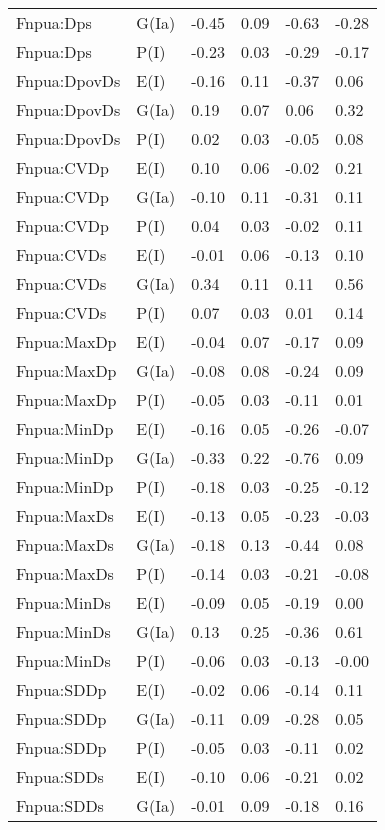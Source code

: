 \begin{center}
\begin{longtable}{|p{1.1in}|p{0.7in}|p{0.7in}|p{0.6in}|p{0.6in}|p{0.6in}|}
  Fnpua:Dps & G(Ia) & -0.45 & 0.09 & -0.63 & -0.28 \\ 
  Fnpua:Dps & P(I) & -0.23 & 0.03 & -0.29 & -0.17 \\ 
  Fnpua:DpovDs & E(I) & -0.16 & 0.11 & -0.37 & 0.06 \\ 
  Fnpua:DpovDs & G(Ia) & 0.19 & 0.07 & 0.06 & 0.32 \\ 
  Fnpua:DpovDs & P(I) & 0.02 & 0.03 & -0.05 & 0.08 \\ 
  Fnpua:CVDp & E(I) & 0.10 & 0.06 & -0.02 & 0.21 \\ 
  Fnpua:CVDp & G(Ia) & -0.10 & 0.11 & -0.31 & 0.11 \\ 
  Fnpua:CVDp & P(I) & 0.04 & 0.03 & -0.02 & 0.11 \\ 
  Fnpua:CVDs & E(I) & -0.01 & 0.06 & -0.13 & 0.10 \\ 
  Fnpua:CVDs & G(Ia) & 0.34 & 0.11 & 0.11 & 0.56 \\ 
  Fnpua:CVDs & P(I) & 0.07 & 0.03 & 0.01 & 0.14 \\ 
  Fnpua:MaxDp & E(I) & -0.04 & 0.07 & -0.17 & 0.09 \\ 
  Fnpua:MaxDp & G(Ia) & -0.08 & 0.08 & -0.24 & 0.09 \\ 
  Fnpua:MaxDp & P(I) & -0.05 & 0.03 & -0.11 & 0.01 \\ 
  Fnpua:MinDp & E(I) & -0.16 & 0.05 & -0.26 & -0.07 \\ 
  Fnpua:MinDp & G(Ia) & -0.33 & 0.22 & -0.76 & 0.09 \\ 
  Fnpua:MinDp & P(I) & -0.18 & 0.03 & -0.25 & -0.12 \\ 
  Fnpua:MaxDs & E(I) & -0.13 & 0.05 & -0.23 & -0.03 \\ 
  Fnpua:MaxDs & G(Ia) & -0.18 & 0.13 & -0.44 & 0.08 \\ 
  Fnpua:MaxDs & P(I) & -0.14 & 0.03 & -0.21 & -0.08 \\ 
  Fnpua:MinDs & E(I) & -0.09 & 0.05 & -0.19 & 0.00 \\ 
  Fnpua:MinDs & G(Ia) & 0.13 & 0.25 & -0.36 & 0.61 \\ 
  Fnpua:MinDs & P(I) & -0.06 & 0.03 & -0.13 & -0.00 \\ 
  Fnpua:SDDp & E(I) & -0.02 & 0.06 & -0.14 & 0.11 \\ 
  Fnpua:SDDp & G(Ia) & -0.11 & 0.09 & -0.28 & 0.05 \\ 
  Fnpua:SDDp & P(I) & -0.05 & 0.03 & -0.11 & 0.02 \\ 
  Fnpua:SDDs & E(I) & -0.10 & 0.06 & -0.21 & 0.02 \\ 
  Fnpua:SDDs & G(Ia) & -0.01 & 0.09 & -0.18 & 0.16 \\ 

\end{longtable}
\end{center}
